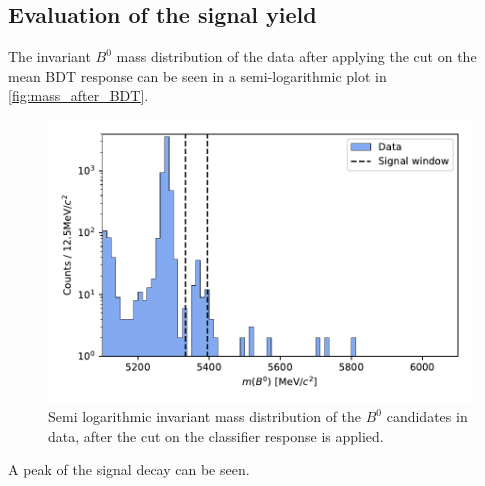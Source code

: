 \subsection{Evaluation of the signal yield}
The invariant $B^0$ mass distribution of the data after applying the cut on the mean BDT response can be seen in a semi-logarithmic plot in \autoref{fig:mass_after_BDT}.
\begin{figure}
  \centering
  \includegraphics[width = .8\textwidth]{"content/plots/mass_after_BDT.pdf"}
  \caption{Semi logarithmic invariant mass distribution of the $B^0$ candidates in data, after the cut on the classifier response is applied.}
  \label{fig:mass_after_BDT}
\end{figure}
A peak of the signal decay \printBstoPsiKs \: can be seen.

